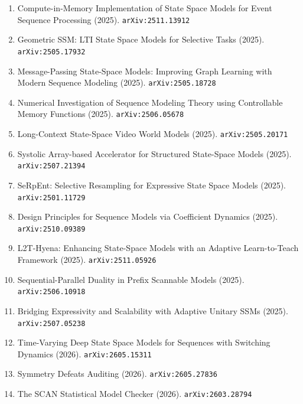 \documentclass[11pt]{article}
\begin{document}
\begin{enumerate}
  \item Compute-in-Memory Implementation of State Space Models for Event Sequence Processing (2025). \texttt{arXiv:2511.13912}
  \item Geometric SSM: LTI State Space Models for Selective Tasks (2025). \texttt{arXiv:2505.17932}
  \item Message-Passing State-Space Models: Improving Graph Learning with Modern Sequence Modeling (2025). \texttt{arXiv:2505.18728}
  \item Numerical Investigation of Sequence Modeling Theory using Controllable Memory Functions (2025). \texttt{arXiv:2506.05678}
  \item Long-Context State-Space Video World Models (2025). \texttt{arXiv:2505.20171}
  \item Systolic Array-based Accelerator for Structured State-Space Models (2025). \texttt{arXiv:2507.21394}
  \item SeRpEnt: Selective Resampling for Expressive State Space Models (2025). \texttt{arXiv:2501.11729}
  \item Design Principles for Sequence Models via Coefficient Dynamics (2025). \texttt{arXiv:2510.09389}
  \item L2T-Hyena: Enhancing State-Space Models with an Adaptive Learn-to-Teach Framework (2025). \texttt{arXiv:2511.05926}
  \item Sequential-Parallel Duality in Prefix Scannable Models (2025). \texttt{arXiv:2506.10918}
  \item Bridging Expressivity and Scalability with Adaptive Unitary SSMs (2025). \texttt{arXiv:2507.05238}
  \item Time-Varying Deep State Space Models for Sequences with Switching Dynamics (2026). \texttt{arXiv:2605.15311}
  \item Symmetry Defeats Auditing (2026). \texttt{arXiv:2605.27836}
  \item The SCAN Statistical Model Checker (2026). \texttt{arXiv:2603.28794}
\end{enumerate}
\end{document}
